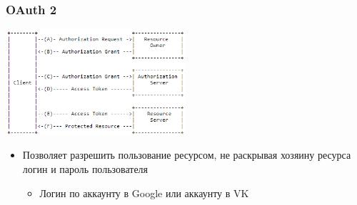 \documentclass{../../slides-style}
\begin{document}
    \begin{frame}
        \frametitle{OAuth 2}
        \begin{center}
            \includegraphics[width=0.5\textwidth]{oauth.png}
        \end{center}
        \begin{itemize}
            \item Позволяет разрешить пользование ресурсом, не раскрывая хозяину ресурса логин и пароль пользователя
            \begin{itemize}
                \item Логин по аккаунту в Google или аккаунту в VK
            \end{itemize}
        \end{itemize}
    \end{frame}
\end{document}
